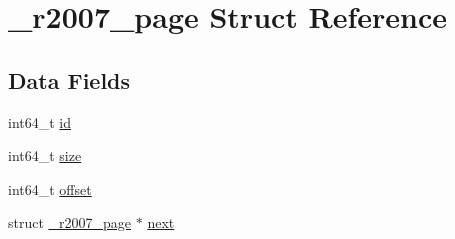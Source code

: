 \hypertarget{struct__r2007__page}{\section{\-\_\-r2007\-\_\-page \-Struct \-Reference}
\label{struct__r2007__page}
}
\subsection*{\-Data \-Fields}
\begin{DoxyCompactItemize}
\item 
int64\-\_\-t \hyperlink{struct__r2007__page_a8a17199a674100b664893fe190f69554}{id}
\item 
int64\-\_\-t \hyperlink{struct__r2007__page_a0d6f5378af94634631a93e9b88c3d471}{size}
\item 
int64\-\_\-t \hyperlink{struct__r2007__page_ab29c99b73dd36f063e7cc630a62d2078}{offset}
\item 
struct \hyperlink{struct__r2007__page}{\-\_\-r2007\-\_\-page} $\ast$ \hyperlink{struct__r2007__page_ab5dd34a5df1ffc2ea2db5d281312fd3d}{next}
\end{DoxyCompactItemize}


